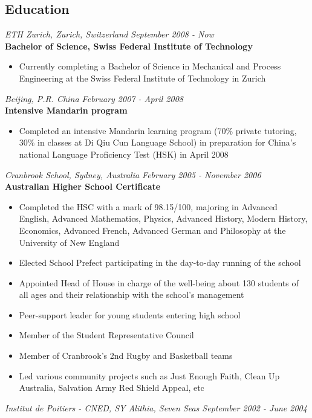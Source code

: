 \documentclass[margin]{res}
\begin{document}
\begin{resume}
\section{Education}
  {\it ETH Zurich, Zurich, Switzerland \hfill September 2008 - Now} \\
  {\bf Bachelor of Science, Swiss Federal Institute of Technology}
  \begin{itemize} \itemsep -0.5pt 
  \item Currently completing a Bachelor of Science in Mechanical and Process Engineering at the Swiss Federal Institute of Technology in Zurich
  \end{itemize}
  {\it Beijing, P.R. China \hfill February 2007 - April 2008} \\
  {\bf Intensive Mandarin program}
  \begin{itemize} \itemsep -0.5pt 
  \item Completed an intensive Mandarin learning program (70\% private tutoring, 30\% in classes at Di Qiu Cun Language School) in preparation for China’s national Language Proficiency Test (HSK) in April 2008
  \end{itemize}
  {\it Cranbrook School, Sydney, Australia \hfill February 2005 - November 2006} \\
  {\bf Australian Higher School Certificate}
  \begin{itemize} \itemsep -0.5pt 
  \item Completed the HSC with a mark of 98.15/100, majoring in Advanced English, Advanced Mathematics, Physics, Advanced History, Modern History, Economics, Advanced French, Advanced German and Philosophy at the University of New England
  \item Elected School Prefect participating in the day-to-day running of the school
  \item Appointed Head of House in charge of the well-being about 130 students of all ages 
and their relationship with the school’s management
  \item Peer-support leader for young students entering high school
  \item Member of the Student Representative Council
  \item Member of Cranbrook’s 2nd Rugby and Basketball teams
  \item Led various community projects such as Just Enough Faith, Clean Up Australia, Salvation Army Red Shield Appeal, etc
  \end{itemize}
  {\it Institut de Poitiers - CNED, SY Alithia, Seven Seas \hfill September 2002 - June 2004}

\end{resume}
\end{document}
